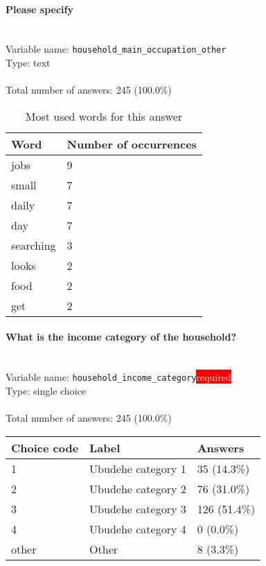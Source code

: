 \documentclass[11.5pt, a4paper]{scrartcl}
\begin{document}
\paragraph{Please specify}
\  \\Variable name: \texttt{household\_main\_occupation\_other}\\
Type: text\\
\\Total number of answers: 245 (100.0\%)
\\[0.2em]\begin{table}[H]
 \begin{tabular}{p{4cm}|p{8cm}}
Word & Number of occurrences  \\
\hline
\cellcolor{mygray}jobs&\cellcolor{mygray}9\\
\hline
small&7\\
\hline
\cellcolor{mygray}daily&\cellcolor{mygray}7\\
\hline
day&7\\
\hline
\cellcolor{mygray}searching&\cellcolor{mygray}3\\
\hline
looks&2\\
\hline
\cellcolor{mygray}food&\cellcolor{mygray}2\\
\hline
get&2\\
\hline
\end{tabular}
\caption{\label{tab:table-name} Most used words for this answer}
\end{table}
\paragraph{What is the income category of the household?}
\  \\Variable name: \texttt{household\_income\_category}\hfill\colorbox{red}{\small{\textcolor{white}{required}}}\\
 Type: single choice\\
\\Total number of answers: 245 (100.0\%)
\\[0.2em] \begin{tabular}{p{4cm}|p{8cm}|p{3cm}}
Choice code & Label & Answers \\
\hline
1 & Ubudehe category 1& \cellcolor{color0}35 (14.3\%)\\
\cellcolor{mygray} 2 & \cellcolor{mygray}Ubudehe category 2 & \cellcolor{color1}76 (31.0\%)\\
3 & Ubudehe category 3& \cellcolor{color2}126 (51.4\%)\\
\cellcolor{mygray} 4 & \cellcolor{mygray}Ubudehe category 4 & \cellcolor{color0}0 (0.0\%)\\
other & Other& \cellcolor{color0}8 (3.3\%)\\
\end{tabular}
\end{document}
